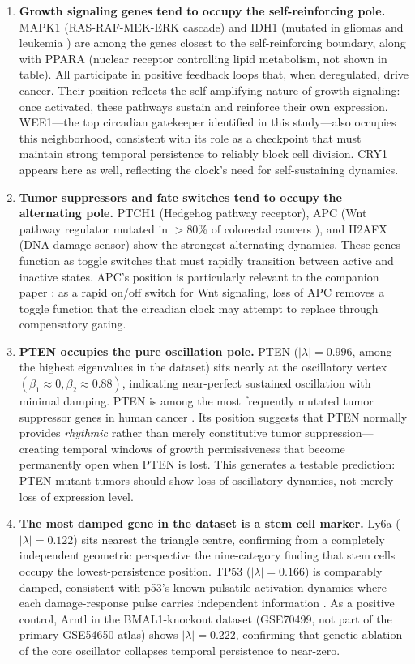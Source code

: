 \documentclass[11pt,letterpaper]{article}
\begin{document}
\begin{enumerate}[noitemsep]
    \item \textbf{Growth signaling genes tend to occupy the self-reinforcing pole.} MAPK1 (RAS-RAF-MEK-ERK cascade) and IDH1 (mutated in gliomas and leukemia \citep{dang2009}) are among the genes closest to the self-reinforcing boundary, along with PPARA (nuclear receptor controlling lipid metabolism, not shown in table). All participate in positive feedback loops that, when deregulated, drive cancer. Their position reflects the self-amplifying nature of growth signaling: once activated, these pathways sustain and reinforce their own expression. WEE1---the top circadian gatekeeper identified in this study---also occupies this neighborhood, consistent with its role as a checkpoint that must maintain strong temporal persistence to reliably block cell division. CRY1 appears here as well, reflecting the clock's need for self-sustaining dynamics.

    \item \textbf{Tumor suppressors and fate switches tend to occupy the alternating pole.} PTCH1 (Hedgehog pathway receptor), APC (Wnt pathway regulator mutated in $>$80\% of colorectal cancers \citep{fodde2002}), and H2AFX (DNA damage sensor) show the strongest alternating dynamics. These genes function as toggle switches that must rapidly transition between active and inactive states. APC's position is particularly relevant to the companion paper \citep{whiteside2026paper2}: as a rapid on/off switch for Wnt signaling, loss of APC removes a toggle function that the circadian clock may attempt to replace through compensatory gating.

    \item \textbf{PTEN occupies the pure oscillation pole.} PTEN ($|\lambda| = 0.996$, among the highest eigenvalues in the dataset) sits nearly at the oscillatory vertex $(\beta_1 \approx 0, \beta_2 \approx 0.88)$, indicating near-perfect sustained oscillation with minimal damping. PTEN is among the most frequently mutated tumor suppressor genes in human cancer \citep{chalhoub2009}. Its position suggests that PTEN normally provides \textit{rhythmic} rather than merely constitutive tumor suppression---creating temporal windows of growth permissiveness that become permanently open when PTEN is lost. This generates a testable prediction: PTEN-mutant tumors should show loss of oscillatory dynamics, not merely loss of expression level.

    \item \textbf{The most damped gene in the dataset is a stem cell marker.} Ly6a ($|\lambda| = 0.122$) sits nearest the triangle centre, confirming from a completely independent geometric perspective the nine-category finding that stem cells occupy the lowest-persistence position. TP53 ($|\lambda| = 0.166$) is comparably damped, consistent with p53's known pulsatile activation dynamics where each damage-response pulse carries independent information \citep{purvis2012}. As a positive control, Arntl in the BMAL1-knockout dataset (GSE70499, not part of the primary GSE54650 atlas) shows $|\lambda| = 0.222$, confirming that genetic ablation of the core oscillator collapses temporal persistence to near-zero.
\end{enumerate}
\end{document}
